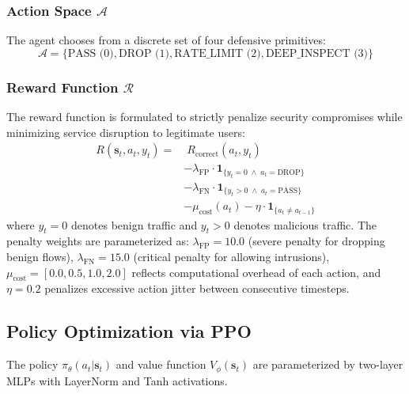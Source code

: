 \documentclass[conference,10pt]{IEEEtran}
\begin{document}
\subsubsection{Action Space $\mathcal{A}$}
The agent chooses from a discrete set of four defensive primitives:
\begin{equation}
\mathcal{A} = \{ \text{PASS (0)}, \text{DROP (1)}, \text{RATE\_LIMIT (2)}, \text{DEEP\_INSPECT (3)} \}
\end{equation}

\subsubsection{Reward Function $\mathcal{R}$}
The reward function is formulated to strictly penalize security compromises while minimizing service disruption to legitimate users:
\begin{align}
R(\mathbf{s}_t, a_t, y_t) = & \; R_{\text{correct}}(a_t, y_t) \nonumber \\
& - \lambda_{\text{FP}} \cdot \mathbf{1}_{\{y_t = 0 \;\land\; a_t = \text{DROP}\}} \nonumber \\
& - \lambda_{\text{FN}} \cdot \mathbf{1}_{\{y_t > 0 \;\land\; a_t = \text{PASS}\}} \nonumber \\
& - \mu_{\text{cost}}(a_t) - \eta \cdot \mathbf{1}_{\{a_t \ne a_{t-1}\}}
\label{eq:reward}
\end{align}
where $y_t=0$ denotes benign traffic and $y_t > 0$ denotes malicious traffic. The penalty weights are parameterized as:
$\lambda_{\text{FP}} = 10.0$ (severe penalty for dropping benign flows),
$\lambda_{\text{FN}} = 15.0$ (critical penalty for allowing intrusions),
$\mu_{\text{cost}} = [0.0, 0.5, 1.0, 2.0]$ reflects computational overhead of each action, and
$\eta = 0.2$ penalizes excessive action jitter between consecutive timesteps.

\subsection{Policy Optimization via PPO}
The policy $\pi_\theta(a_t|\mathbf{s}_t)$ and value function $V_\phi(\mathbf{s}_t)$ are parameterized by two-layer MLPs with LayerNorm and Tanh activations.
\end{document}
